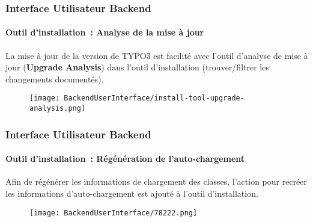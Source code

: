 \begin{frame}[fragile]
	\frametitle{Interface Utilisateur Backend}
	\framesubtitle{Outil d'installation~: Analyse de la mise à jour}


	La mise à jour de la version de TYPO3 est facilité avec l'outil d'analyse de mise à
	jour (\textbf{Upgrade Analysis}) dans l'outil d'installation (trouver/filtrer
	les changements documentés).

	\begin{figure}
		\texttt{[image: BackendUserInterface/install-tool-upgrade-analysis.png]}
	\end{figure}

\end{frame}


\begin{frame}[fragile]
	\frametitle{Interface Utilisateur Backend}
	\framesubtitle{Outil d'installation~: Régénération de l'auto-chargement}

	Afin de régénérer les informations de chargement des classes, l'action pour
	recréer les informations d'auto-chargement est ajouté à l'outil d'installation.

	\begin{figure}
		\texttt{[image: BackendUserInterface/78222.png]}
	\end{figure}

\end{frame}

